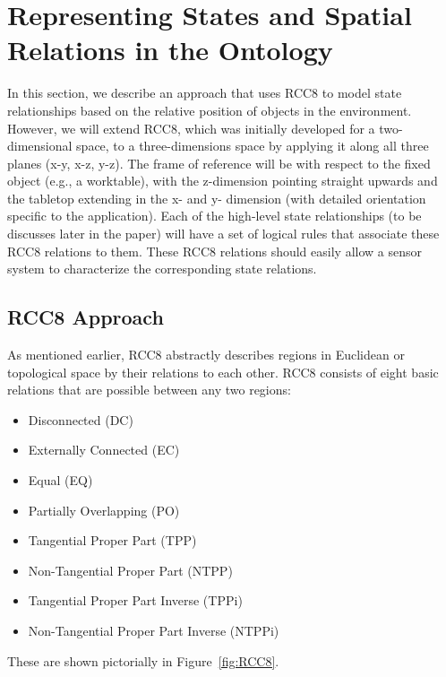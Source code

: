 \documentclass[final,1p,times]{elsarticle}
\begin{document}
\section{Representing States and Spatial Relations in the Ontology}\label{S:section2}
In this section, we describe an approach that uses RCC8 to model state relationships based on the relative position of objects in the environment. However, we will extend RCC8, which was initially developed for a two-dimensional space, to a three-dimensions space by applying it along all three planes (x-y, x-z, y-z). The frame of reference will be with respect to the fixed object (e.g., a worktable), with the z-dimension pointing straight upwards and the tabletop extending in the x- and y- dimension (with detailed orientation specific to the application).  Each of the high-level state relationships (to be discusses later in the paper) will have a set of logical rules that associate these RCC8 relations to them. These RCC8 relations should easily allow a sensor system to characterize the corresponding state relations.

\subsection{RCC8 Approach}
As mentioned earlier, RCC8 abstractly describes regions in Euclidean or topological space by their relations to each other. RCC8 consists of eight basic relations that are possible between any two regions:

\begin{itemize}
  \item Disconnected (DC)
  \item Externally Connected (EC)
  \item Equal (EQ)
  \item Partially Overlapping (PO)
  \item Tangential Proper Part (TPP)
  \item Non-Tangential Proper Part (NTPP)
  \item Tangential Proper Part Inverse (TPPi)
  \item Non-Tangential Proper Part Inverse (NTPPi)
\end{itemize}

These are shown pictorially in Figure~\ref{fig:RCC8}.
\end{document}
